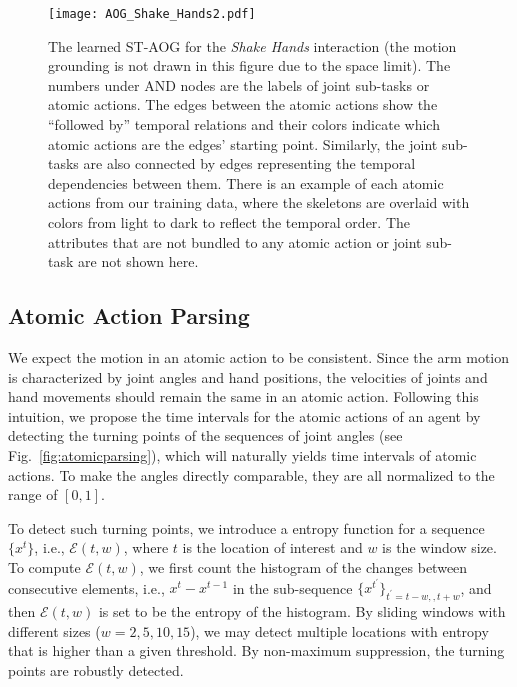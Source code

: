 \documentclass[letterpaper, 10 pt, conference]{ieeeconf}  %
\begin{document}
\begin{figure*}[t!]
    \centering
    \texttt{[image: AOG\_Shake\_Hands2.pdf]}
    \vspace{-10pt}
    \caption{The learned ST-AOG for the \textit{Shake Hands} interaction (the motion grounding is not drawn in this figure due to the space limit). The numbers under AND nodes are the labels of joint sub-tasks or atomic actions. The edges between the atomic actions show the ``followed by'' temporal relations and their colors indicate which atomic actions are the edges' starting point. Similarly, the joint sub-tasks are also connected by edges representing the temporal dependencies between them. There is an example of each atomic actions from our training data, where the skeletons are overlaid with colors from light to dark to reflect the temporal order. The attributes that are not bundled to any atomic action or joint sub-task are not shown here.}
    \vspace{-5pt}
    \label{fig:AOG_Shake_Hands}
\end{figure*}





\subsection{Atomic Action Parsing}

We expect the motion in an atomic action to be consistent. Since the arm motion is characterized by joint angles and hand positions, the velocities of joints and hand movements should remain the same in an atomic action. Following this intuition, we propose the time intervals for the atomic actions of an agent by detecting the turning points of the sequences of joint angles (see Fig.~\ref{fig:atomicparsing}), which will naturally yields time intervals of atomic actions. To make the angles directly comparable, they are all normalized to the range of $[0, 1]$. 

To detect such turning points, we introduce a entropy function for a sequence $\{x^t\}$, i.e., $\mathcal{E}(t, w)$, where $t$ is the location of interest and $w$ is the window size. To compute $\mathcal{E}(t, w)$, we first count the histogram of the changes between consecutive elements, i.e., $x^t - x^{t-1}$ in the sub-sequence $\{x^{t^\prime}\}_{t^\prime=t-w,, t+w}$, and then $\mathcal{E}(t, w)$ is set to be the entropy of the histogram. By sliding windows with different sizes ($w = 2, 5, 10, 15$), we may detect multiple locations with entropy that is higher than a given threshold. By non-maximum suppression, the turning points are robustly detected.
\end{document}
